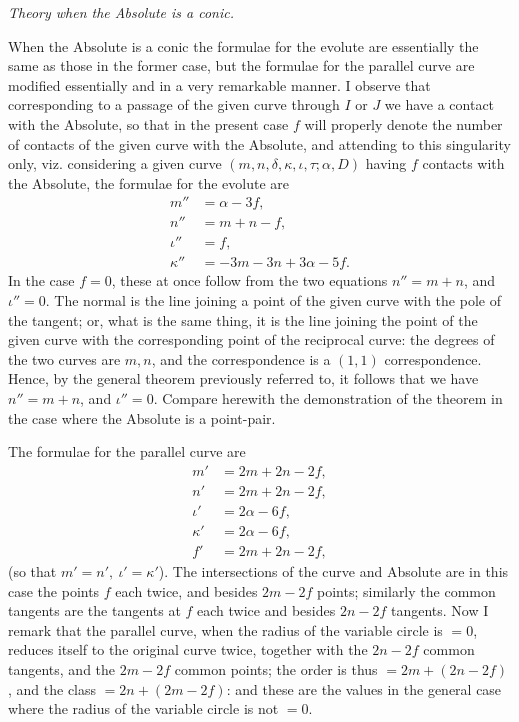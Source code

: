 ﻿\documentclass[11pt,a4paper]{article}
\theoremstyle{plain}
\theoremstyle{definition}
\begin{document}
\begin{center}
\textit{Theory when the Absolute is a conic.}
\end{center}

When the Absolute is a conic the formulae for the evolute are essentially
the same as those in the former case, but the formulae for the parallel
curve are modified essentially and in a very remarkable manner. I observe
that corresponding to a passage of the given curve through \(I\) or \(J\)
we have a contact with the Absolute, so that in the present case \(f\) will
properly denote the number of contacts of the given curve with the
Absolute, and attending to this singularity only, viz. considering a given
curve \((m,n,\delta,\kappa,\iota,\tau;\alpha,D)\) having \(f\) contacts
with the Absolute, the formulae for the evolute are
\[
\begin{aligned}
m''&=\alpha-3f,\\
n''&=m+n-f,\\
\iota''&=f,\\
\kappa''&=-3m-3n+3\alpha-5f.
\end{aligned}
\]
In the case \(f=0\), these at once follow from the two equations
\(n''=m+n\), and \(\iota''=0\). The normal is the line joining a point of
the given curve with the pole of the tangent; or, what is the same thing,
it is the line joining the point of the given curve with the corresponding
point of the reciprocal curve: the degrees of the two curves are \(m,n\),
and the correspondence is a \((1,1)\) correspondence. Hence, by the
general theorem previously referred to, it follows that we have
\(n''=m+n\), and \(\iota''=0\). Compare herewith the demonstration of the
theorem in the case where the Absolute is a point-pair.

The formulae for the parallel curve are
\[
\begin{aligned}
m'&=2m+2n-2f,\\
n'&=2m+2n-2f,\\
\iota'&=2\alpha-6f,\\
\kappa'&=2\alpha-6f,\\
f'&=2m+2n-2f,
\end{aligned}
\]
(so that \(m'=n',\ \iota'=\kappa'\)). The intersections of the curve and
Absolute are in this case the points \(f\) each twice, and besides
\(2m-2f\) points; similarly the common tangents are the tangents at \(f\)
each twice and besides \(2n-2f\) tangents. Now I remark that the parallel
curve, when the radius of the variable circle is \(=0\), reduces itself to
the original curve twice, together with the \(2n-2f\) common tangents, and
the \(2m-2f\) common points; the order is thus \(=2m+(2n-2f)\), and the
class \(=2n+(2m-2f)\): and these are the values in the general case where
the radius of the variable circle is not \(=0\).
\end{document}
